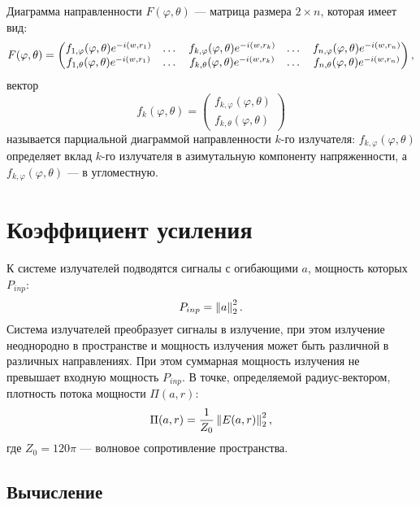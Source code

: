 Диаграмма направленности $F(\varphi, \theta)$ --- матрица размера $2 \times n$, которая имеет вид:
\[
    F(\varphi, \theta)
    = \begin{pmatrix}
        f_{1,\varphi}(\varphi, \theta) e^{-i \left ( w, r_1 \right )} & \dots & f_{k,\varphi}(\varphi, \theta) e^{-i \left ( w, r_k \right )} & \dots & f_{n,\varphi}(\varphi, \theta) e^{-i \left ( w, r_n \right )} \\
        f_{1,\theta}(\varphi, \theta) e^{-i \left ( w, r_1 \right )}  & \dots & f_{k,\theta}(\varphi, \theta) e^{-i \left ( w, r_k \right )}  & \dots & f_{n,\theta}(\varphi, \theta) e^{-i \left ( w, r_n \right )}  \\
    \end{pmatrix} ,
\]
вектор
\[
    f_k(\varphi, \theta)
    = \begin{pmatrix}
        f_{k,\varphi}(\varphi, \theta) \\
        f_{k,\theta}(\varphi, \theta)
    \end{pmatrix}
\]
называется парциальной диаграммой направленности $k$-го излучателя: $f_{k,\varphi}(\varphi, \theta)$ определяет вклад $k$-го излучателя в азимутальную
компоненту напряженности, а $f_{k,\varphi}(\varphi, \theta)$ --- в угломестную.


\section{Коэффициент усиления}

К системе излучателей подводятся сигналы с огибающими $a$, мощность которых $P_{inp}$:
\[
    P_{inp} = \left \| a \right \|_2^2.
\]
Система излучателей преобразует сигналы в излучение, при этом излучение неоднородно в пространстве и мощность излучения может быть различной в
различных направлениях. При этом суммарная мощность излучения не превышает входную мощность $P_{inp}$. В точке, определяемой радиус-вектором,
плотность потока мощности $\Pi(a, r)$:
\[
    \Pi(a, r) = \frac{1}{Z_0} \left \| E(a, r) \right \|_2^2 ,
\]
где $Z_0 = 120 \pi$ --- волновое сопротивление пространства.

\subsection{Вычисление}

